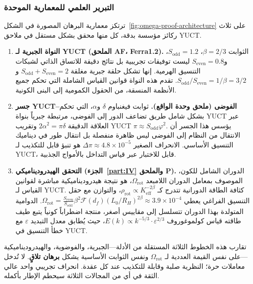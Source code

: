 \documentclass[12pt,a4paper]{article}
\begin{document}
	\subsubsection*{التبرير العلمي للمعمارية الموحدة}
	
	ترتكز معمارية البرهان المصورة في الشكل~\ref{fig:omega-proof-architecture} على ثلاث ركائز مؤسسة بدقة، كل منها محقق بشكل مستقل في ملاحق YUCT.
	
	\begin{enumerate}
		\item \textbf{النواة الجبرية لـ YUCT (الملحق AF، Ferra1.2).} الثوابت \(\beta = 2/3\)، \(S_{\mathrm{odd}}=1.2\)، و\(S_{\mathrm{even}}=0.8\) ليست توفيقات تجريبية بل نتائج دقيقة للاتساق الذاتي لشبكات التنسيق الهرمية. إنها تشكل حلقة جبرية مغلقة \(S_{\mathrm{odd}}+S_{\mathrm{even}}=2\) و\(S_{\mathrm{odd}}/S_{\mathrm{even}} = 1/\beta = 3/2\). تقدم هذه النواة قوانين القياس الشاملة التي تحكم جميع الأنظمة المنسقة، من الحقول الكمومية إلى البنى الكونية.
		
		\item \textbf{جسر YUCT–الفوضى (ملحق وحدة الواقع).} ثوابت فيغنباوم \(\delta\) و\(\alpha\)، التي تحكم بشكل شامل طريق تضاعف الدور إلى الفوضى، مرتبطة جبرياً بنواة YUCT عبر العلاقة الدقيقة \(2\alpha^2 = \pi\delta\) وتقريب YUCT \(\pi \approx S_{\mathrm{odd}}\varphi^2\). يؤسس هذا الجسر أن الانتقال من النظام إلى الفوضى ليس ظاهرة منفصلة بل انتقال طور في ديناميك التنسيق الأساسي. الانحراف الصغير \(\Delta\pi \approx 4.8\times10^{-5}\) هو تنبؤ قابل للتكذيب لـ YUCT، قابل للاختبار عبر قياس التداخل بالأمواج الجذبية.
		
		\item \textbf{التحقق الهيدروديناميكي (الجزء~\ref{part:IV} والملحق P).} الدوران الشامل للكون، الموصوف بمعامل الدوران اللامبعد \(\Omega_{\mathrm{rot}}\)، هو نتيجة هيدروديناميكية مباشرة لقوانين القياس لـ YUCT. كثافة الطاقة الدورانية تتدرج كـ \(\rho_{\mathrm{rot}} \propto K_{\mathrm{eff}}^{-2\beta}\)، والتوازن مع حقل التنسيق الفراغي يعطي \(\Omega_{\mathrm{rot}} = \frac{S_{\mathrm{even}}}{S_{\mathrm{odd}}} \beta^2 \mathcal{F}(d_f) (L_0/R_H)^{2\beta} \approx 3.9\times10^{-4}\). الدوامية المتولدة بهذا الدوران تتسلسل إلى مقاييس أصغر، منتجة اضطراباً كونياً يتبع طيف طاقته قياس كولموغوروف \(E(k) \propto k^{-5/3} \cdot \varepsilon^{2/3}\)، حيث يُطابق معدل التبديد \(\varepsilon\) مع خطأ التنسيق في YUCT.
	\end{enumerate}
	
	تقارب هذه الخطوط الثلاثة المستقلة من الأدلة---الجبرية، والفوضوية، والهيدروديناميكية---على نفس القيمة العددية لـ \(\Omega_{\mathrm{rot}}\) ونفس الثوابت الأساسية يشكل \textbf{برهان تلاقٍ}. لا تُدخل معاملات حرة؛ النظرية صلبة وقابلة للتكذيب عند كل عقدة. انحراف تجريبي واحد عالي الثقة في أي من المجالات الثلاثة سيحطم الإطار بأكمله.
	
\end{document}
